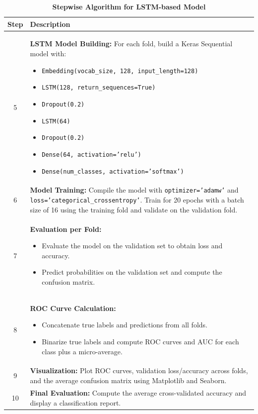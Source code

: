 \begin{table}[H]
    \caption*{\textbf{Stepwise Algorithm for LSTM-based Model}}
    \label{tab:lstm_algorithm}
    \centering
    \renewcommand{\arraystretch}{1.3}
    \small
    \begin{tabularx}{\textwidth}{|c|X|}
        \hline
        \textbf{Step} & \textbf{Description} \\
        \hline
        5 & \textbf{LSTM Model Building:} For each fold, build a Keras Sequential model with:
              \begin{itemize}[noitemsep, topsep=0pt]
                  \item \texttt{Embedding(vocab\_size, 128, input\_length=128)}
                  \item \texttt{LSTM(128, return\_sequences=True)}
                  \item \texttt{Dropout(0.2)}
                  \item \texttt{LSTM(64)}
                  \item \texttt{Dropout(0.2)}
                  \item \texttt{Dense(64, activation='relu')}
                  \item \texttt{Dense(num\_classes, activation='softmax')}
              \end{itemize} \\
        \hline
        6 & \textbf{Model Training:} Compile the model with \texttt{optimizer='adamw'} and \texttt{loss='categorical\_crossentropy'}. Train for 20 epochs with a batch size of 16 using the training fold and validate on the validation fold. \\
        \hline
        7 & \textbf{Evaluation per Fold:} 
              \begin{itemize}[noitemsep, topsep=0pt]
                  \item Evaluate the model on the validation set to obtain loss and accuracy.
                  \item Predict probabilities on the validation set and compute the confusion matrix.
              \end{itemize} \\
        \hline
        8 & \textbf{ROC Curve Calculation:}  
              \begin{itemize}[noitemsep, topsep=0pt]
                  \item Concatenate true labels and predictions from all folds.
                  \item Binarize true labels and compute ROC curves and AUC for each class plus a micro-average.
              \end{itemize} \\
        \hline
        9 & \textbf{Visualization:} Plot ROC curves, validation loss/accuracy across folds, and the average confusion matrix using Matplotlib and Seaborn. \\
        \hline
        10 & \textbf{Final Evaluation:} Compute the average cross-validated accuracy and display a classification report. \\
        \hline
    \end{tabularx}
\end{table}


